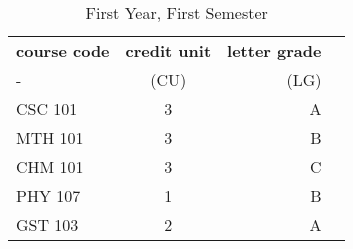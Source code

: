 \documentclass{article}
\begin{document}
	\begin{table}[h!]
		\begin{center}
			\caption {First Year, First Semester}
			\label{tab:table1}
			\begin{tabular}{l|c|r|c|}
				\textbf{course code} & \textbf{credit unit} & \textbf{letter grade}\\ 
				- & (CU) & (LG) \\
				\hline
				CSC 101 & 3 & A \\
				MTH 101 & 3 & B \\
				CHM 101 & 3 & C  \\
				PHY 107 & 1 & B  \\
				GST 103 & 2 & A  \\
			\end{tabular}
		\end{center}
	\end{table}
	
	
	
\end{document}
